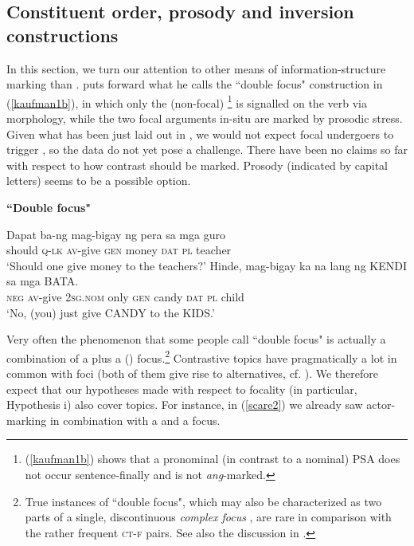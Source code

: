 \documentclass[output=paper,
,modfonts
,nonflat]{langsci/langscibook}
\begin{document}
\subsection{Constituent order, prosody and inversion constructions}\label{sect:is_tagalog}

In this section, we turn our attention to other means of information-structure marking than . \cite{kauda05} puts forward what he calls the ``double focus" construction in (\ref{kaufman1b}), in which only the (non-focal) \footnote{ (\ref{kaufman1b}) shows that a pronominal (in contrast to a nominal) PSA does not occur sentence-finally and is not \textit{ang}-marked.} is signalled on the verb via  morphology, while the two focal  arguments in-situ are marked by prosodic stress. Given what has been just laid out in , we would not expect focal undergoers to trigger , so the data do not yet pose a challenge. There have been no claims so far with respect to how contrast should be marked. Prosody (indicated by capital letters) seems to be a possible option. 

\begin{exe}
\ex\label{kaufmannex1} \textbf{``Double focus" \citep[187ff.]{kauda05}} 
\begin{xlist}
\ex
\gll Dapat    ba-ng    mag-bigay    ng pera    sa mga guro{\USQMark}\\
            should    \textsc{q-lk}    \textsc{av}-give    \textsc{gen} money    \textsc{dat} \textsc{pl} teacher\\
\glt `Should one give money to the teachers?'
\ex \label{kaufman1b}
\gll Hinde, mag-bigay ka {na lang} {{\ob}ng} {KENDI{\cb}\focus} {{\ob}sa} mga {BATA{\cb}\focus}.\\
\textsc{neg} \textsc{av}-give \textsc{2sg.nom} only \textsc{\void{[}gen} candy \textsc{\void{[}dat} \textsc{pl} child\\
\glt `No, (you) just give CANDY to the KIDS.' 
\end{xlist}
\end{exe}

\noindent Very often the phenomenon that some people call ``double focus" is actually a combination of a  \citep{bueda03} plus a () focus.\footnote{True instances of ``double focus", which may also be characterized as two parts of a single, discontinuous \textit{complex focus} \citep{krima92}, are rare in comparison with the rather frequent \textsc{ct-f} pairs. See also the discussion in \cite[216]{riear13}.} Contrastive topics have pragmatically a lot in common with foci (both of them give rise to alternatives, cf. \citealt{rooma92}). We therefore expect that our hypotheses made with respect to focality (in particular, Hypothesis i) also cover  topics. For instance, in (\ref{scare2}) we already saw actor- marking in combination with a  and a focus. 
\end{document}
